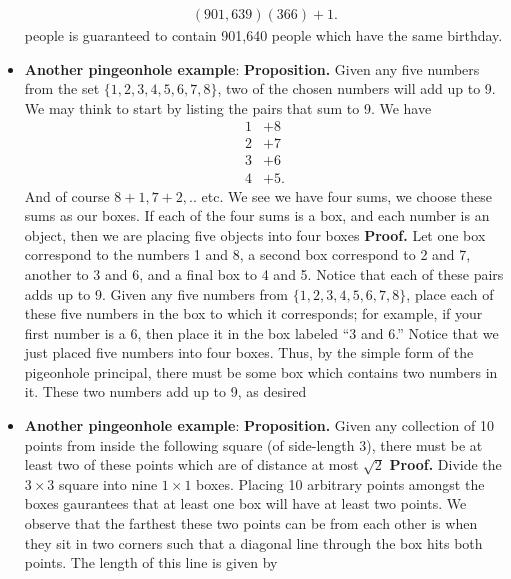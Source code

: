 \documentclass{report}
\begin{document}
\begin{itemize}
            \begin{align*}
                (901, 639)(366) + 1
            .\end{align*}
            \bigbreak \noindent 
            people is guaranteed to contain 901,640 people which have the same birthday.
        \item \textbf{Another pingeonhole example}:
            \bigbreak \noindent 
            \textbf{Proposition.} Given any five numbers from the set $\{1, 2, 3, 4, 5, 6, 7, 8\}$, two of the chosen numbers will add up to 9.
            \bigbreak \noindent 
            We may think to start by listing the pairs that sum to 9. We have
            \begin{align*}
                1 &+ 8 \\ 
                2 &+ 7 \\
                3 &+ 6 \\
                4 &+ 5 
            .\end{align*}
            And of course $8+1,7+2,..$ etc. We see we have four sums, we choose these sums as our boxes. If each of the four sums is a box, and each number is an object, then we are placing five objects into four boxes 
            \bigbreak \noindent 
            \textbf{Proof.} Let one box correspond to the numbers 1 and 8, a second box correspond to 2 and 7, another to 3 and 6, and a final box to 4 and 5. Notice that each of these pairs adds up to 9.
            \bigbreak \noindent 
            Given any five numbers from $\{1, 2, 3, 4, 5, 6, 7, 8\}$, place each of these five numbers in the box to which it corresponds; for example, if your first number is a 6, then place it in the box labeled “3 and 6.” Notice that we just placed five numbers into four boxes. Thus, by the simple form of the pigeonhole principal, there must be some box which contains two numbers in it. These two numbers add up to 9, as desired
        \item \textbf{Another pingeonhole example}:
            \bigbreak \noindent 
            \textbf{Proposition.} Given any collection of 10 points from inside the following square (of side-length 3), there must be at least two of these points which are of distance at most $\sqrt{2}$
            \bigbreak \noindent 
            \bigbreak \noindent 
            \textbf{Proof.} Divide the $3\times 3$ square into nine $1\times 1$ boxes. Placing 10 arbitrary points amongst the boxes gaurantees that at least one box will have at least two points. We observe that the farthest these two points can be from each other is when they sit in two corners such that a diagonal line through the box hits both points. The length of this line is given by

\end{itemize}
\end{document}
